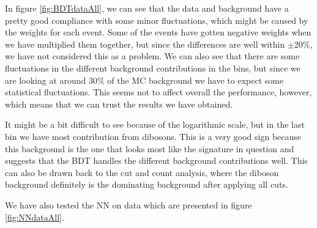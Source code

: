 In figure \ref{fig:BDTdataAll}, we can see that the data and background have a pretty good compliance with some minor fluctuations, which might be caused by the weights for each event. Some of the events have gotten negative weights when we have multiplied them together, but since the differences are well within $\pm$20\%, we have not considered this as a problem. We can also see that there are some fluctuations in the different background contributions in the bins, but since we are looking at around 30\% of the MC background we have to expect some statistical fluctuations. This seems not to affect overall the performance, however, which means that we can trust the results we have obtained. 

It might be a bit difficult to see because of the logarithmic scale, but in the last bin we have most contribution from dibosons. This is a very good sign because this background is the one that looks most like the signature in question and suggests that the BDT handles the different background contributions well. This can also be drawn back to the cut and count analysis, where the diboson background definitely is the dominating background after applying all cuts. 

We have also tested the NN on data which are presented in figure \ref{fig:NNdataAll}.

